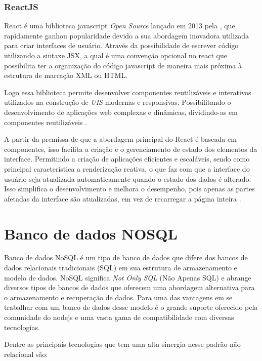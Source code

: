 \subsubsection{ReactJS}
React é uma biblioteca javascript \textit{Open Source} lançado em 2013 pela , que rapidamente ganhou popularidade devido a sua abordagem inovadora utilizada para criar interfaces de usuário. 
Através da possibilidade de escrever código utilizando a sintaxe JSX, a qual é uma convenção opcional no react que possibilita ter a organização do código javascript de maneira mais próxima à estrutura de marcação XML ou HTML.

    Logo essa biblioteca permite desenvolver componentes reutilizáveis e interativos utilizados na construção de \textit{UIS} modernas e responsivas. Possibilitando o desenvolvimento de aplicações web complexas e dinâmicas, dividindo-as em componentes reutilizáveis .

    A partir da premissa de que a abordagem principal do React é baseada em componentes, isso facilita a criação e o gerenciamento de estado dos elementos da interface. Permitindo a criação de aplicações eficientes e escaláveis, sendo como principal característica a renderização reativa, o que faz com que a interface do usuário seja atualizada automaticamente quando o estado dos dados é alterado. Isso simplifica o desenvolvimento e melhora o desempenho, pois apenas as partes afetadas da interface são atualizadas, em vez de recarregar a página inteira \cite{ReactMet54}.

\section{Banco de dados NOSQL}
Banco de dados NoSQL é um tipo de banco de dados que difere dos bancos de dados relacionais tradicionais (SQL) em sua estrutura de armazenamento e modelo de dados. NoSQL significa \textit{Not Only SQL} (Não Apenas SQL) e abrange diversos tipos de bancos de dados que oferecem uma abordagem alternativa para o armazenamento e recuperação de dados.
Para  uma das vantagens em se trabalhar com um banco de dados desse modelo é o grande suporte oferecido pela comunidade do nodejs e uma vasta gama de compatibilidade com diversas tecnologias.

Dentre as principais tecnologias que tem uma alta sinergia nesse padrão não relacional são: 



